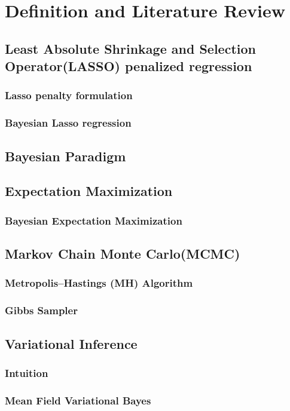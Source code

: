 \chapter{Definition and Literature Review}
\label{Chapter2}
\section{Least Absolute Shrinkage and Selection Operator(LASSO) penalized regression}
\subsection{Lasso penalty formulation}
\subsection{Bayesian Lasso regression}

\section{Bayesian Paradigm}

\section{Expectation Maximization}
\subsection{Bayesian Expectation Maximization}

\section{Markov Chain Monte Carlo(MCMC)}
\label{MCMC}
\subsection{Metropolis–Hastings (MH) Algorithm}
\subsection{Gibbs Sampler}

\section{Variational Inference}
\label{VI}
\subsection{Intuition}
\subsection{Mean Field Variational Bayes}







